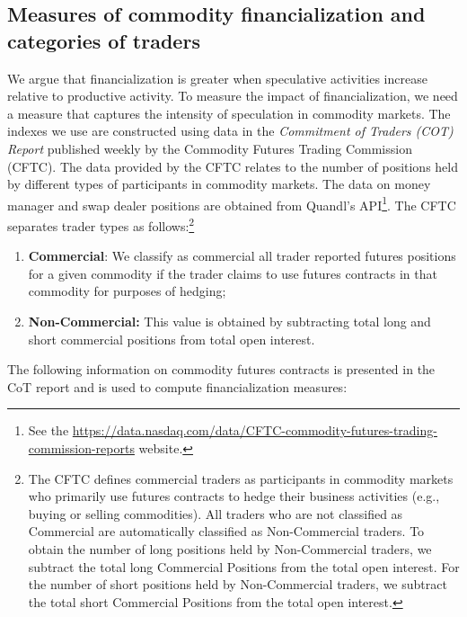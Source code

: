 \subsection{Measures of commodity financialization and categories of traders}
We argue that financialization is greater when speculative activities increase relative to productive activity. To measure the impact of financialization, we need a measure that captures the intensity of speculation in commodity markets. The indexes we use are constructed using data in the \emph{Commitment of Traders (COT) Report} published weekly by the Commodity Futures Trading Commission (CFTC).  The data provided by the CFTC relates to the number of positions held by different types of participants in commodity markets. The data on money manager and swap dealer positions are obtained from Quandl's API\footnote{See the \url{https://data.nasdaq.com/data/CFTC-commodity-futures-trading-commission-reports} website.}.  The CFTC separates trader types as follows:\footnote{The CFTC defines commercial traders as participants in commodity markets who primarily use futures contracts to hedge their business activities (e.g., buying or selling commodities). All traders who are not classified as Commercial are automatically classified as Non-Commercial traders. To obtain the number of long positions held by Non-Commercial traders, we subtract the total long Commercial Positions from the total open interest. For the number of short positions held by Non-Commercial traders, we subtract the total short Commercial Positions from the total open interest.}

\begin{enumerate}
\item \textbf{Commercial}: We classify as commercial all trader reported futures positions for a given commodity if the trader claims to use futures contracts in that commodity for purposes of hedging;
\item \textbf{Non-Commercial:} This value is obtained by subtracting total long and short commercial positions from  total open interest.
\end{enumerate}
  
The following information on commodity futures contracts is presented in the CoT report and is used to compute financialization measures:

